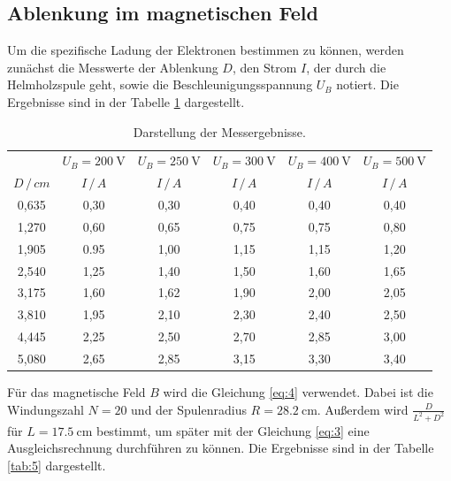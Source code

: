 \subsection{Ablenkung im magnetischen Feld}
Um die spezifische Ladung der Elektronen bestimmen zu können, werden zunächst
die Messwerte der Ablenkung $D$, den Strom $I$, der durch die Helmholzspule geht, sowie die
Beschleunigungsspannung $U_B$ notiert.
Die Ergebnisse sind in der Tabelle \ref{tab:4} dargestellt.
\begin{table}[H]
  \centering
  \caption{Darstellung der Messergebnisse.}
  \label{tab:4}
  \begin{tabular}{c c c c c c}
\toprule
& \multicolumn{1}{c}{$U_B=\SI{200}{\volt}$} & \multicolumn{1}{c}{$U_B=\SI{250}{\volt}$} &\multicolumn{1}{c}{$U_B=\SI{300}{\volt}$}&\multicolumn{1}{c}{$U_B=\SI{400}{\volt}$}&\multicolumn{1}{c}{$U_B=\SI{500}{\volt}$}\\
\cmidrule(lr){2-2}\cmidrule(lr){3-3}\cmidrule(lr){4-4}\cmidrule(lr){5-5}\cmidrule(lr){6-6}
$D \, / \, cm$ & $I \, / \, A$ & $I \, / \, A$ & $I \, / \, A$ &$I \, / \, A$ & $I \, / \, A$\\
\midrule
0,635 & 0,30  & 0,30 & 0,40 & 0,40& 0,40\\
1,270 & 0,60  & 0,65 & 0,75 & 0,75& 0,80\\
1,905 & 0.95  & 1,00 & 1,15 & 1,15& 1,20\\
2,540 & 1,25  & 1,40 & 1,50 & 1,60& 1,65\\
3,175 & 1,60  & 1,62 & 1,90 & 2,00& 2,05\\
3,810 & 1,95  & 2,10 & 2,30 & 2,40& 2,50\\
4,445 & 2,25  & 2,50 & 2,70 & 2,85& 3,00\\
5,080 & 2,65  & 2,85 & 3,15 & 3,30& 3,40\\
\bottomrule
  \end{tabular}
\end{table}
Für das magnetische Feld $B$ wird die Gleichung \ref{eq:4} verwendet. Dabei ist die
Windungszahl $N = 20 $ und der Spulenradius $R = \SI{28.2}{\centi\meter}$.
Außerdem wird $\frac{D}{L^2+D^2}$ für $L = \SI{17.5}{\centi\meter}$ bestimmt, um später
mit der Gleichung \ref{eq:3} eine Ausgleichsrechnung durchführen zu können.
Die Ergebnisse sind in der Tabelle \ref{tab:5} dargestellt.
